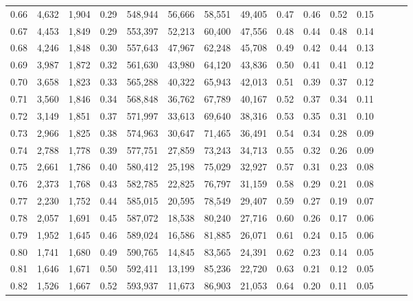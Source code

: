 \begin{tabular}{rrrrrrrrrrrrrrr}
0.66 &   4,632 &  1,904 &  0.29 &  548,944 &   56,666 &   58,551 &   49,405 &  0.47 &  0.46 &  0.52 &      0.15 \\
0.67 &   4,453 &  1,849 &  0.29 &  553,397 &   52,213 &   60,400 &   47,556 &  0.48 &  0.44 &  0.48 &      0.14 \\
0.68 &   4,246 &  1,848 &  0.30 &  557,643 &   47,967 &   62,248 &   45,708 &  0.49 &  0.42 &  0.44 &      0.13 \\
0.69 &   3,987 &  1,872 &  0.32 &  561,630 &   43,980 &   64,120 &   43,836 &  0.50 &  0.41 &  0.41 &      0.12 \\
0.70 &   3,658 &  1,823 &  0.33 &  565,288 &   40,322 &   65,943 &   42,013 &  0.51 &  0.39 &  0.37 &      0.12 \\
0.71 &   3,560 &  1,846 &  0.34 &  568,848 &   36,762 &   67,789 &   40,167 &  0.52 &  0.37 &  0.34 &      0.11 \\
0.72 &   3,149 &  1,851 &  0.37 &  571,997 &   33,613 &   69,640 &   38,316 &  0.53 &  0.35 &  0.31 &      0.10 \\
0.73 &   2,966 &  1,825 &  0.38 &  574,963 &   30,647 &   71,465 &   36,491 &  0.54 &  0.34 &  0.28 &      0.09 \\
0.74 &   2,788 &  1,778 &  0.39 &  577,751 &   27,859 &   73,243 &   34,713 &  0.55 &  0.32 &  0.26 &      0.09 \\
0.75 &   2,661 &  1,786 &  0.40 &  580,412 &   25,198 &   75,029 &   32,927 &  0.57 &  0.31 &  0.23 &      0.08 \\
0.76 &   2,373 &  1,768 &  0.43 &  582,785 &   22,825 &   76,797 &   31,159 &  0.58 &  0.29 &  0.21 &      0.08 \\
0.77 &   2,230 &  1,752 &  0.44 &  585,015 &   20,595 &   78,549 &   29,407 &  0.59 &  0.27 &  0.19 &      0.07 \\
0.78 &   2,057 &  1,691 &  0.45 &  587,072 &   18,538 &   80,240 &   27,716 &  0.60 &  0.26 &  0.17 &      0.06 \\
0.79 &   1,952 &  1,645 &  0.46 &  589,024 &   16,586 &   81,885 &   26,071 &  0.61 &  0.24 &  0.15 &      0.06 \\
0.80 &   1,741 &  1,680 &  0.49 &  590,765 &   14,845 &   83,565 &   24,391 &  0.62 &  0.23 &  0.14 &      0.05 \\
0.81 &   1,646 &  1,671 &  0.50 &  592,411 &   13,199 &   85,236 &   22,720 &  0.63 &  0.21 &  0.12 &      0.05 \\
0.82 &   1,526 &  1,667 &  0.52 &  593,937 &   11,673 &   86,903 &   21,053 &  0.64 &  0.20 &  0.11 &      0.05 \\

\end{tabular}
